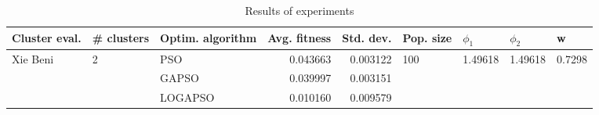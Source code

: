 \begin{table}
\centering
\caption{Results of experiments}
\begin{tabular}{lllrrllll}
\toprule
            Cluster eval. &        \# clusters & Optim. algorithm &  Avg. fitness &  Std. dev. &            Pop. size &               $\phi_{1}$ &               $\phi_{2}$ &                       w \\
\midrule
\multirow{3}{*}{Xie Beni} & \multirow{3}{*}{2} &              PSO &      0.043663 &   0.003122 & \multirow{3}{*}{100} & \multirow{3}{*}{1.49618} & \multirow{3}{*}{1.49618} & \multirow{3}{*}{0.7298} \\
                          &                    &            GAPSO &      0.039997 &   0.003151 &                      &                          &                          &                         \\
                          &                    &          LOGAPSO &      0.010160 &   0.009579 &                      &                          &                          &                         \\
\bottomrule
\end{tabular}
\end{table}
